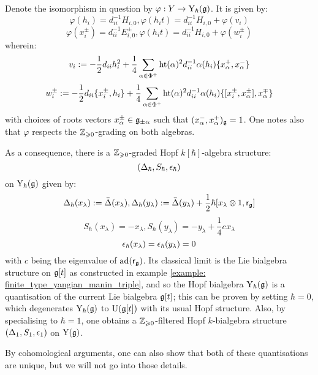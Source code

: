 \begin{example}
            Denote the isomorphism in question by $\varphi: Y \to \mathrm{Y}_{\hbar}(\mathfrak{g})$. It is given by:
                $$\varphi(h_i) = d_{ii}^{-1} H_{i, 0}, \varphi(h_i t) = d_{ii}^{-1} H_{i, 0} + \varphi(v_i)$$
                $$\varphi(x_i^{\pm}) = d_{ii}^{-1} E_{i, 0}^{\pm}, \varphi(h_i t) = d_{ii}^{-1} H_{i, 0} + \varphi(w_i^{\pm})$$
            wherein:
                $$v_i := -\frac12 d_{ii} h_i^2 + \frac14 \sum_{\alpha \in \Phi^+} \operatorname{ht}(\alpha)^2 d_{ii}^{-1} \alpha(h_i) \{x_{\alpha}^+, x_{\alpha}^-\}$$
                $$w_i^{\pm} := -\frac12 d_{ii} \{x_i^{\pm}, h_i\} + \frac14 \sum_{\alpha \in \Phi^+} \operatorname{ht}(\alpha)^2 d_{ii}^{-1} \alpha(h_i) \{[x_i^{\pm}, x_{\alpha}^{\pm}], x_{\alpha}^{\mp}\}$$
            with choices of roots vectors $x_{\alpha}^{\pm} \in \mathfrak{g}_{\pm \alpha}$ such that $(x_{\alpha}^-, x_{\alpha}^+)_{\mathfrak{g}} = 1$. One notes also that $\varphi$ respects the $\mathbb{Z}_{\geqslant 0}$-grading on both algebras.
        
            As a consequence, there is a $\mathbb{Z}_{\geqslant 0}$-graded Hopf $k[\hbar]$-algebra structure:
                $$(\Delta_{\hbar}, S_{\hbar}, \epsilon_{\hbar})$$
            on $\mathrm{Y}_{\hbar}(\mathfrak{g})$ given by:
                $$\Delta_{\hbar}(x_{\lambda}) := \bar{\Delta}(x_{\lambda}), \Delta_{\hbar}(y_{\lambda}) := \bar{\Delta}(y_{\lambda}) + \frac12 \hbar [x_{\lambda} \tensor 1, \sfr_{\g}]$$
                $$S_{\hbar}(x_{\lambda}) = -x_{\lambda}, S_{\hbar}(y_{\lambda}) = -y_{\lambda} + \frac14 c_{} x_{\lambda}$$
                $$\epsilon_{\hbar}(x_{\lambda}) = \epsilon_{\hbar}(y_{\lambda}) = 0$$
            with $c$ being the eigenvalue of $\mathrm{ad}(\mathsf{r}_{\mathfrak{g}})$. Its classical limit is the Lie bialgebra structure on $\mathfrak{g}[t]$ as constructed in example \ref{example: finite_type_yangian_manin_triple}, and so the Hopf bialgebra $\mathrm{Y}_{\hbar}(\mathfrak{g})$ is a quantisation of the current Lie bialgebra $\mathfrak{g}[t]$; this can be proven by setting $\hbar = 0$, which degenerates $\mathrm{Y}_{\hbar}(\mathfrak{g})$ to $\mathrm{U}(\mathfrak{g}[t])$ with its usual Hopf structure. Also, by specialising to $\hbar = 1$, one obtains a $\mathbb{Z}_{\geqslant 0}$-filtered Hopf $k$-bialgebra structure $(\Delta_1, S_1, \epsilon_1)$ on $\mathrm{Y}(\mathfrak{g})$.
        \end{example}
        By cohomological arguments, one can also show that both of these quantisations are unique, but we will not go into those details.
        


